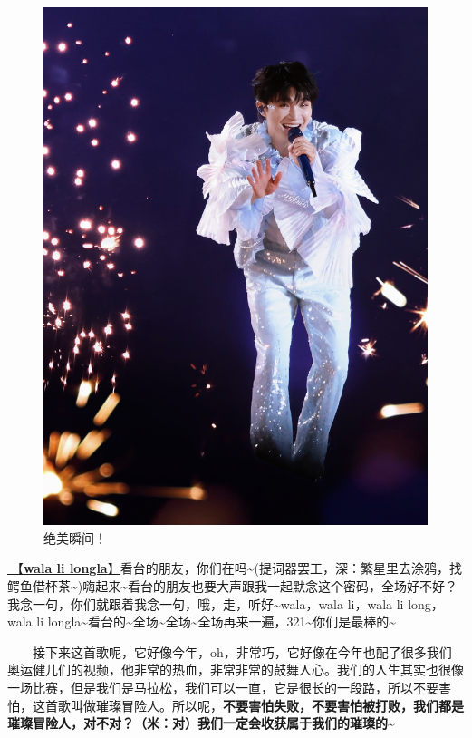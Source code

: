 \documentclass[]{ctexbook}
\begin{document}
\begin{figure}

{\centering \includegraphics[width=450pt]{img/beijing20240921/001} 

}

\caption{绝美瞬间！}\label{fig:unnamed-chunk-98}
\end{figure}

\hyperref[wala-li-longla]{🎵【\textbf{wala li longla}】}看台的朋友，你们在吗\textasciitilde(提词器罢工，深：繁星里去涂鸦，找鳄鱼借杯茶\textasciitilde)嗨起来\textasciitilde 看台的朋友也要大声跟我一起默念这个密码，全场好不好？我念一句，你们就跟着我念一句，哦，走，听好\textasciitilde wala，wala li，wala li long，wala li longla\textasciitilde 看台的\textasciitilde 全场\textasciitilde 全场\textasciitilde 全场再来一遍，321\textasciitilde 你们是最棒的\textasciitilde{}

  接下来这首歌呢，它好像今年，oh，非常巧，它好像在今年也配了很多我们奥运健儿们的视频，他非常的热血，非常非常的鼓舞人心。我们的人生其实也很像一场比赛，但是我们是马拉松，我们可以一直，它是很长的一段路，所以不要害怕，这首歌叫做璀璨冒险人。所以呢，\textbf{不要害怕失败，不要害怕被打败，我们都是璀璨冒险人，对不对？（米：对）我们一定会收获属于我们的璀璨的\textasciitilde{}}
\end{document}
